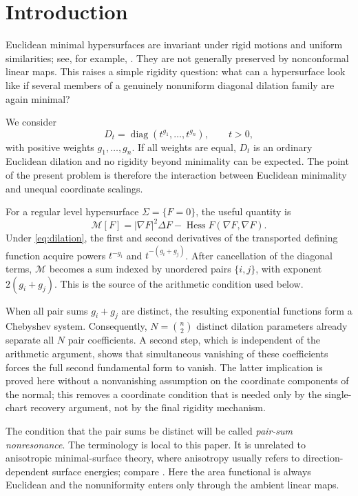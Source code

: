 \documentclass[preprint,12pt]{elsarticle}
\numberwithin{equation}{section}
\theoremstyle{definition}\newtheorem{definition}[theorem]{Definition}
\theoremstyle{remark}\newtheorem{remark}[theorem]{Remark}
\begin{document}
\section{Introduction}\label{sec:intro}

Euclidean minimal hypersurfaces are invariant under rigid motions and uniform similarities; see, for example, \cite{Osserman1986,ColdingMinicozzi2011}. They are not generally preserved by nonconformal linear maps. This raises a simple rigidity question: what can a hypersurface look like if several members of a genuinely nonuniform diagonal dilation family are again minimal?

We consider
\begin{equation}\label{eq:dilation}
D_t=\operatorname{diag}(t^{g_1},\ldots,t^{g_n}),\qquad t>0,
\end{equation}
with positive weights $g_1,\ldots,g_n$. If all weights are equal, $D_t$ is an ordinary Euclidean dilation and no rigidity beyond minimality can be expected. The point of the present problem is therefore the interaction between Euclidean minimality and unequal coordinate scalings.

For a regular level hypersurface $\Sigma=\{F=0\}$, the useful quantity is
\begin{equation}\label{eq:minop-intro}
\mathcal M[F]=|\nabla F|^2\Delta F-\operatorname{Hess}F(\nabla F,\nabla F).
\end{equation}
Under \eqref{eq:dilation}, the first and second derivatives of the transported defining function acquire powers $t^{-g_i}$ and $t^{-(g_i+g_j)}$. After cancellation of the diagonal terms, $\mathcal M$ becomes a sum indexed by unordered pairs $\{i,j\}$, with exponent $2(g_i+g_j)$. This is the source of the arithmetic condition used below.

When all pair sums $g_i+g_j$ are distinct, the resulting exponential functions form a Chebyshev system. Consequently, $N=\binom n2$ distinct dilation parameters already separate all $N$ pair coefficients. A second step, which is independent of the arithmetic argument, shows that simultaneous vanishing of these coefficients forces the full second fundamental form to vanish. The latter implication is proved here without a nonvanishing assumption on the coordinate components of the normal; this removes a coordinate condition that is needed only by the single-chart recovery argument, not by the final rigidity mechanism.

The condition that the pair sums be distinct will be called \emph{pair-sum nonresonance}. The terminology is local to this paper. It is unrelated to anisotropic minimal-surface theory, where anisotropy usually refers to direction-dependent surface energies; compare \cite{MooneyYang2024}. Here the area functional is always Euclidean and the nonuniformity enters only through the ambient linear maps.
\end{document}
